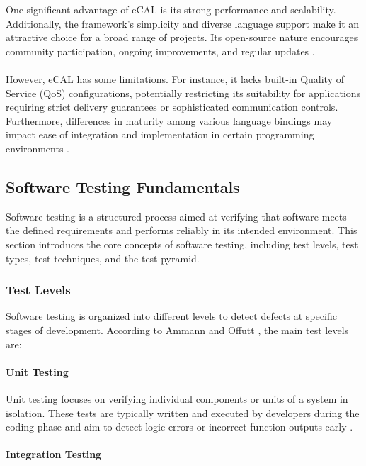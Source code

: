One significant advantage of eCAL is its strong performance and scalability. Additionally, the framework's simplicity and diverse language support make it an attractive choice for a broad range of projects. Its open-source nature encourages community participation, ongoing improvements, and regular updates \cite{ecal_github}.
\\
\\
However, eCAL has some limitations. For instance, it lacks built-in Quality of Service (QoS) configurations, potentially restricting its suitability for applications requiring strict delivery guarantees or sophisticated communication controls. Furthermore, differences in maturity among various language bindings may impact ease of integration and implementation in certain programming environments \cite{ecal_official_docs}.






\subsection{Software Testing Fundamentals}

Software testing is a structured process aimed at verifying that software meets the defined requirements and performs reliably in its intended environment. This section introduces the core concepts of software testing, including test levels, test types, test techniques, and the test pyramid.

\subsubsection{Test Levels}

Software testing is organized into different levels to detect defects at specific stages of development. According to Ammann and Offutt \cite{ammann2016introduction}, the main test levels are:

\paragraph{Unit Testing}

Unit testing focuses on verifying individual components or units of a system in isolation. These tests are typically written and executed by developers during the coding phase and aim to detect logic errors or incorrect function outputs early \cite{pressman2014software}.

\paragraph{Integration Testing}

